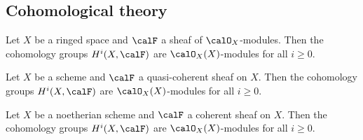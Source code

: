 \subsection{Cohomological theory}

    \begin{theorem}\label{thm:cohomology_of_sheaves_of_modules}
        Let $X$ be a ringed space and $\calF$ a sheaf of $\calO_X$-modules. Then the cohomology groups $H^i(X,\calF)$ are $\calO_X(X)$-modules for all $i\geq 0$.
    \end{theorem}

    \begin{theorem}\label{thm:cohomology_of_quasi-coherent_sheaves}
        Let $X$ be a scheme and $\calF$ a quasi-coherent sheaf on $X$. Then the cohomology groups $H^i(X,\calF)$ are $\calO_X(X)$-modules for all $i\geq 0$.
    \end{theorem}

    \begin{theorem}\label{thm:cohomology_of_coherent_sheaves}
        Let $X$ be a noetherian scheme and $\calF$ a coherent sheaf on $X$. Then the cohomology groups $H^i(X,\calF)$ are $\calO_X(X)$-modules for all $i\geq 0$.
    \end{theorem}